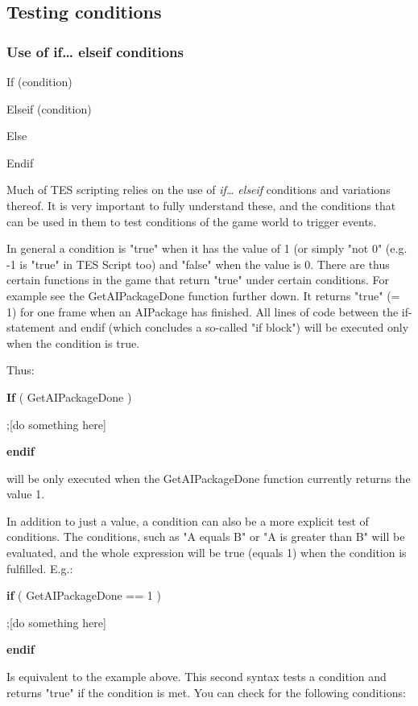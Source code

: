\documentclass[
]{article}
\begin{document}
\hypertarget{testing-conditions}{%
\subsection{Testing conditions}\label{testing-conditions}}

\hypertarget{use-of-if-elseif-conditions}{%
\subsubsection{Use of if\ldots{} elseif
conditions}\label{use-of-if-elseif-conditions}}

If (condition)

Elseif (condition)

Else

Endif

Much of TES scripting relies on the use of \emph{if\ldots{} elseif}
conditions and variations thereof. It is very important to fully
understand these, and the conditions that can be used in them to test
conditions of the game world to trigger events.

In general a condition is "true" when it has the value of 1 (or simply
"not 0" (e.g. -1 is "true" in TES Script too) and "false" when the value
is 0. There are thus certain functions in the game that return "true"
under certain conditions. For example see the GetAIPackageDone function
further down. It returns "true" (= 1) for one frame when an AIPackage
has finished. All lines of code between the if-statement and endif
(which concludes a so-called "if block") will be executed only when the
condition is true.

Thus:

\textbf{If} ( GetAIPackageDone )

;{[}do something here{]}

\textbf{endif}

will be only executed when the GetAIPackageDone function currently
returns the value 1.

In addition to just a value, a condition can also be a more explicit
test of conditions. The conditions, such as "A equals B" or "A is
greater than B" will be evaluated, and the whole expression will be true
(equals 1) when the condition is fulfilled. E.g.:

\textbf{if} ( GetAIPackageDone == 1 )

;{[}do something here{]}

\textbf{endif}

Is equivalent to the example above. This second syntax tests a condition
and returns "true" if the condition is met. You can check for the
following conditions:
\end{document}

